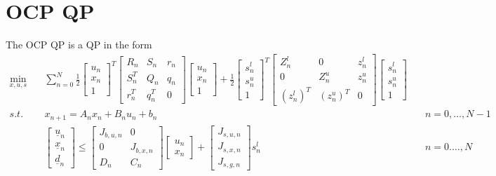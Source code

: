 \documentclass[a4paper]{report}
\begin{document}
\chapter{OCP QP}

The OCP QP is a QP in the form
\begin{align*}
\min_{x,u,s} & \quad \sum_{n=0}^N \frac 1 2 \begin{bmatrix} u_n \\ x_n \\ 1 \end{bmatrix}^T \begin{bmatrix} R_n & S_n & r_n \\ S_n^T & Q_n & q_n \\ r_n^T & q_n^T & 0 \end{bmatrix} \begin{bmatrix} u_n \\ x_n \\ 1 \end{bmatrix} + \frac 1 2 \begin{bmatrix} s^l_n \\ s^u_n \\ 1 \end{bmatrix}^T \begin{bmatrix} Z^l_n & 0 & z^l_n \\ 0 & Z^u_n & z^u_n \\ (z^l_n)^T & (z^u_n)^T & 0 \end{bmatrix} \begin{bmatrix} s^l_n \\ s^u_n \\ 1 \end{bmatrix} \\
s.t. & \quad x_{n+1} = A_n x_n + B_n u_n + b_n & \quad n=0,\dots,N-1 \\
& \quad \begin{bmatrix} \underline u_n \\ \underline x_n \\ \underline d_n \end{bmatrix} \leq \begin{bmatrix} J_{b,u,n} & 0 \\ 0 & J_{b,x,n} \\ D_n & C_n \end{bmatrix} \begin{bmatrix} u_n \\ x_n \end{bmatrix} + \begin{bmatrix} J_{s,u,n} \\ J_{s,x,n} \\ J_{s,g,n} \end{bmatrix} s^l_n & \quad n=0.\dots,N \\

\end{align*}
\end{document}
